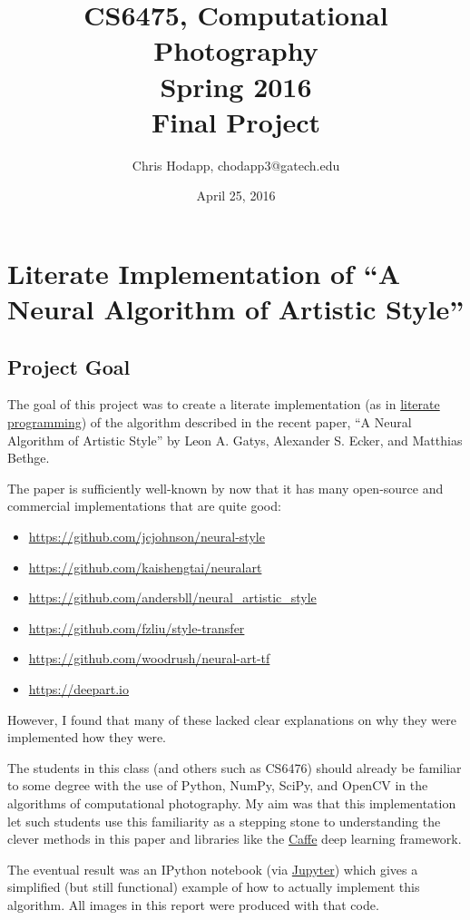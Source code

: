 \documentclass{article}
\title
    {CS6475, Computational Photography \\
      Spring 2016 \\
      Final Project}
\date{April 25, 2016}
\author{Chris Hodapp, chodapp3@gatech.edu}
\begin{document}
\maketitle

\section{Literate Implementation of ``A Neural Algorithm of Artistic Style''}

\subsection{Project Goal}

The goal of this project was to create a literate implementation (as
in \href{https://en.wikipedia.org/wiki/Literate_programming}{literate
  programming}) of the algorithm described in the recent paper, ``A
Neural Algorithm of Artistic Style'' by Leon A. Gatys, Alexander
S. Ecker, and Matthias Bethge\cite{neuralstyle2015}.

The paper is sufficiently well-known by now that it has many
open-source and commercial implementations that are quite good:

\begin{itemize}
  \item \url{https://github.com/jcjohnson/neural-style}
  \item \url{https://github.com/kaishengtai/neuralart}
  \item \url{https://github.com/andersbll/neural_artistic_style}
  \item \url{https://github.com/fzliu/style-transfer}
  \item \url{https://github.com/woodrush/neural-art-tf}
  \item \url{https://deepart.io}
\end{itemize}

However, I found that many of these lacked clear explanations on why
they were implemented how they were.

The students in this class (and others such as CS6476) should already
be familiar to some degree with the use of Python, NumPy, SciPy, and
OpenCV in the algorithms of computational photography.  My aim was
that this implementation let such students use this familiarity as a
stepping stone to understanding the clever methods in this paper and
libraries like the \href{http://caffe.berkeleyvision.org/}{Caffe} deep
learning framework.

The eventual result was an IPython notebook (via
\href{https://jupyter.org/}{Jupyter}) which gives a simplified (but
still functional) example of how to actually implement this algorithm.
All images in this report were produced with that code.
\end{document}
